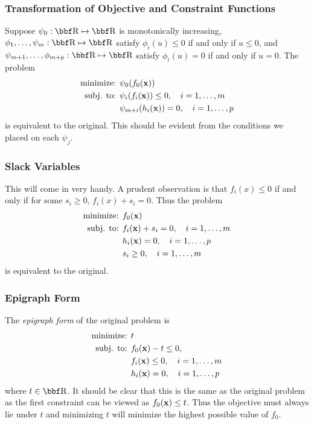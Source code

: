 \documentclass{article}
\begin{document}
\subsubsection{Transformation of Objective and Constraint Functions}

Suppose $\psi_0 : \RR \mapsto \RR$ is monotonically increasing, $\phi_1,\dots,
\psi_m : \RR \mapsto \RR$ satisfy $\phi_i(u) \leq 0$ if and only if $u \leq 0$,
and $\psi_{m+1},\dots,\phi_{m+p} : \RR\mapsto\RR$ satisfy $\phi_i(u)=0$ if and only
if $u=0$. The problem
\begin{align*}
    \text{minimize: } & \psi_0(f_0({\bf x}))\\
    \text{subj. to: } & \psi_i(f_i({\bf x})) \leq 0, \quad i=1,\dots,m\\
                      & \psi_{m+i}(h_i({\bf x})) = 0, \quad i=1,\dots,p
\end{align*}
is equivalent to the original. This should be evident from the conditions
we placed on each $\psi_j$.

\subsubsection{Slack Variables}

This will come in very handy. A prudent observation is that $f_i(x)\leq 0$
if and only if for some $s_i \geq 0$, $f_i(x) + s_i = 0$. Thus the problem
\begin{align*}
    \text{minimize: } & f_0({\bf x})\\
    \text{subj. to: } & f_i({\bf x}) + s_i = 0, \quad i=1,\dots,m\\
                      & h_i({\bf x}) = 0, \quad i=1,\dots,p\\
                      & s_i \geq 0, \quad i=1,\dots,m
\end{align*}
is equivalent to the original.

\subsubsection{Epigraph Form}

The \textit{epigraph form} of the original problem is
\begin{align*}
    \text{minimize: } & t\\
    \text{subj. to: } & f_0({\bf x}) - t \leq 0,\\
                      & f_i({\bf x}) \leq 0, \quad i=1,\dots,m\\
                      & h_i({\bf x}) = 0, \quad i=1,\dots,p
\end{align*}
where $t\in\RR$. It should be clear that this is the same as the original
problem as the first constraint can be viewed as $f_0({\bf x}) \leq t$. Thus
the objective must always lie under $t$ and minimizing $t$ will minimize the
highest possible value of $f_0$.
\end{document}
